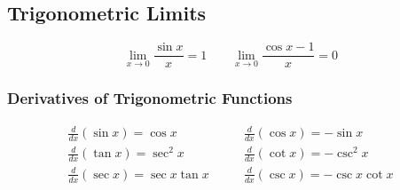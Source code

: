 %
%
%

\subsection{Trigonometric Limits}
\begin{equation}
    \lim_{x \rightarrow 0} \frac{\sin x}{x} = 1 \qquad \lim_{x \rightarrow 0} \frac{\cos x - 1}{x} = 0
\end{equation}

\subsubsection{Derivatives of Trigonometric Functions}
\begin{align}
    \frac{d}{dx} (\sin x) = \cos x \qquad &\frac{d}{dx}(\cos x) = -\sin x \\
    \frac{d}{dx} (\tan x) = \sec^2 x \qquad &\frac{d}{dx}(\cot x) = -\csc^2 x \\
    \frac{d}{dx} (\sec x) = \sec x \tan x \qquad &\frac{d}{dx}(\csc x) = -\csc x \cot x 
\end{align}
